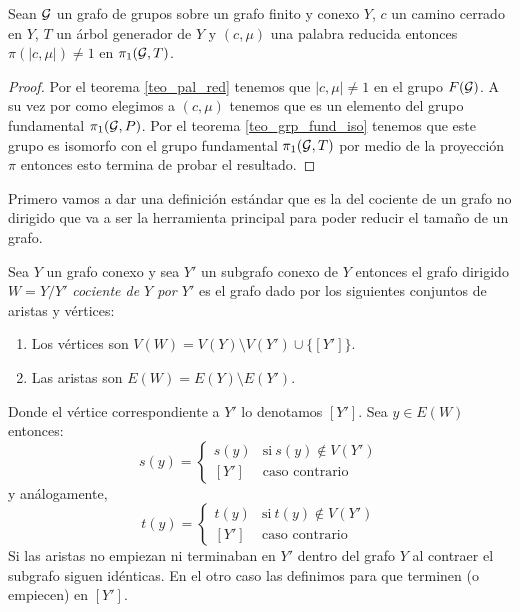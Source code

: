 \documentclass[tesis.tex]{subfiles}
\begin{document}
\begin{coro}\label{coro_pal_red_3}
	Sean ${\cal G}$ un grafo de grupos sobre un grafo finito y conexo $Y$, $c$ un camino cerrado en $Y$, $T$ un árbol generador de $Y$ y $(c, \mu)$ una palabra reducida entonces $\pi(|c,\mu|) \neq 1$ en $\pi_1({\cal G}, T)$. 
\end{coro}
\begin{proof}
	Por el teorema \ref{teo_pal_red} tenemos que $|c,\mu| \neq 1$ en el grupo $F({\cal G})$.
	A su vez por como elegimos a $(c, \mu)$ tenemos que es un elemento del grupo fundamental $\pi_1({\cal G}, P)$.
	Por el teorema \ref{teo_grp_fund_iso} tenemos que este grupo es isomorfo con el grupo fundamental $\pi_1({\cal G}, T)$ por medio de la proyección $\pi$ entonces esto termina de probar el resultado.
\end{proof}





Primero vamos a dar una definición estándar que es la del cociente de un grafo no dirigido que va a ser la herramienta principal para poder reducir el tamaño de un grafo.

\begin{deff}
	Sea $Y$ un grafo conexo y sea $Y'$ un subgrafo conexo de $Y$ entonces
	el grafo dirigido $W = Y/Y'$ \emph{cociente de $Y$ por $Y'$} es el grafo dado por los siguientes conjuntos de aristas y vértices:
	
	\begin{enumerate}
		\item Los vértices son $V(W)= V(Y) \setminus V(Y') \cup \{ [Y'] \}$.
		\item Las aristas son $E(W) = E(Y) \setminus E(Y')$.
	\end{enumerate}
	Donde el vértice correspondiente a $Y'$ lo denotamos $[Y']$. 
	Sea $y \in E(W)$ entonces:
	\begin{equation*}
		s(y) = 
		\begin{cases}
			s(y)  & \text{si} \ s(y) \notin V(Y') \\ 
			[Y'] & \text{caso contrario}
		\end{cases}
	\end{equation*}
	y análogamente,
	\begin{equation*}
		t(y) = 
		\begin{cases}
			t(y)  & \text{si} \ t(y) \notin V(Y') \\ 
			[Y'] & \text{caso contrario}
		\end{cases}
	\end{equation*}
	Si las aristas no empiezan ni terminaban en $Y'$ dentro del grafo $Y$ al contraer el subgrafo siguen idénticas. 
	En el otro caso las definimos para que terminen (o empiecen) en $[Y']$. 
	
\end{deff}
\end{document}
